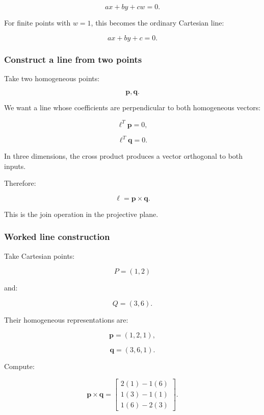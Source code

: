 \[
 \boxed{ ax+by+cw=0 }.
\]

For finite points with \(w=1\), this becomes the ordinary Cartesian line:

\[
 ax+by+c=0.
\]

\subsubsection{Construct a line from two points}\label{02-foundations-ii-ch032-construct-a-line-from-two-points}

\hypertarget{02-foundations-ii-ch032-construct-a-line-from-two-points}{}

Take two homogeneous points:

\[
 \mathbf p,\mathbf q.
\]

We want a line whose coefficients are perpendicular to both homogeneous vectors:

\[
 \boldsymbol\ell^T\mathbf p=0,
\]

\[
 \boldsymbol\ell^T\mathbf q=0.
\]

In three dimensions, the cross product produces a vector orthogonal to both inputs.

Therefore:

\[
 \boxed{ \boldsymbol\ell=\mathbf p\times\mathbf q }.
\]

This is the join operation in the projective plane.

\subsubsection{Worked line construction}\label{02-foundations-ii-ch032-worked-line-construction}

\hypertarget{02-foundations-ii-ch032-worked-line-construction}{}

Take Cartesian points:

\[
 P=(1,2)
\]

and:

\[
 Q=(3,6).
\]

Their homogeneous representations are:

\[
 \mathbf p=(1,2,1),
\]

\[
 \mathbf q=(3,6,1).
\]

Compute:

\[
 \mathbf p\times\mathbf q= \begin{bmatrix} 2(1)-1(6)\\ 1(3)-1(1)\\ 1(6)-2(3) \end{bmatrix}.
\]

